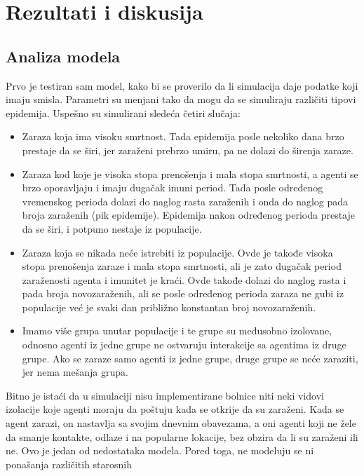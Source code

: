 \section{Rezultati i diskusija}

\subsection{Analiza modela}

Prvo je testiran sam model, kako bi se proverilo da li simulacija daje podatke koji
imaju smisla. Parametri su menjani tako da mogu da se simuliraju različiti tipovi
epidemija. Uspešno su simulirani sledeća četiri slučaja:

\begin{itemize}
    \item Zaraza koja ima visoku smrtnost. Tada epidemija posle nekoliko dana brzo
    prestaje da se širi, jer zaraženi prebrzo umiru, pa ne dolazi do širenja zaraze.
    \item Zaraza kod koje je visoka stopa prenošenja i mala stopa smrtnosti, a agenti se
    brzo oporavljaju i imaju dugačak imuni period. Tada posle određenog
    vremenskog perioda dolazi do naglog rasta zaraženih i onda do naglog pada
    broja zaraženih (pik epidemije). Epidemija nakon određenog perioda prestaje da
    se širi, i potpuno nestaje iz populacije.
    \item Zaraza koja se nikada neće istrebiti iz populacije. Ovde je takođe visoka stopa
    prenošenja zaraze i mala stopa smrtnosti, ali je zato dugačak period zaraženosti
    agenta i imunitet je kraći. Ovde takođe dolazi do naglog rasta i pada broja
    novozaraženih, ali se posle određenog perioda zaraza ne gubi iz populacije već
    je svaki dan približno konstantan broj novozaraženih.
    \item Imamo više grupa unutar populacije i te grupe su međusobno izolovane,
    odnosno agenti iz jedne grupe ne ostvaruju interakcije sa agentima iz druge
    grupe. Ako se zaraze samo agenti iz jedne grupe, druge grupe se neće zaraziti,
    jer nema mešanja grupa.
\end{itemize}

Bitno je istaći da u simulaciji nisu implementirane bolnice niti neki vidovi izolacije
koje agenti moraju da poštuju kada se otkrije da su zaraženi. Kada se agent zarazi, on
nastavlja sa svojim dnevnim obavezama, a oni agenti koji ne žele da smanje kontakte,
odlaze i na popularne lokacije, bez obzira da li su zaraženi ili ne. Ovo je jedan od
nedostataka modela. Pored toga, ne modeluju se ni ponašanja različitih starosnih

